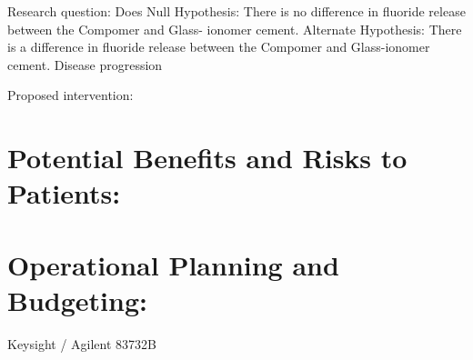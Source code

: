 \documentclass[fleqn,10pt]{paper}
\begin{document}
Research question: 
Does 
Null Hypothesis: There is no difference in fluoride release between the Compomer and Glass- ionomer cement.
Alternate Hypothesis: There is a difference in fluoride release between the Compomer and Glass-ionomer cement.
Disease progression

Proposed intervention:



\section{Potential Benefits and Risks to Patients:}

\section{Operational Planning and Budgeting:}



Keysight / Agilent 83732B
\end{document}

